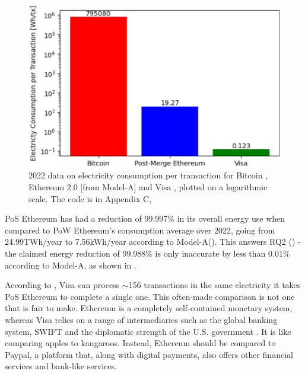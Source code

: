 \begin{figure}[!htb]
    \includegraphics[width=13cm,center]{Figures/ElectricityConsumptionPlot.png}
    \caption{2022 data on electricity consumption per transaction for Bitcoin \cite{BitcoinDigiconomist}, Ethereum 2.0 [from Model-A] and Visa \cite{2022VisaReport}, \cite{VisaHome} plotted on a logarithmic scale. The code is in Appendix C, }
    \label{Figure:ElectricityConsumptionPlot}
\end{figure}

PoS Ethereum has had a reduction of 99.997\% in its overall energy use when compared to PoW Ethereum's consumption average over 2022, going from 24.99TWh/year to 7.56kWh/year according to Model-A(\cite{CCRIIndices}). This answers RQ2 () - the claimed energy reduction of 99.988\% is only inaccurate by less than 0.01\% according to Model-A, as shown in .

According to , Visa can process 
$\sim$156 transactions in the same electricity it takes PoS Ethereum to complete a single one. This often-made comparison is not one that is fair to make. Ethereum is a completely self-contained monetary system, whereas Visa relies on a range of intermediaries such as the global banking system, SWIFT and the diplomatic strength of the U.S. government \cite{Carter2021BitcoinComparison}. It is like comparing apples to kangaroos. Instead, Ethereum should be compared to Paypal, a platform that, along with digital payments, also offers other financial services and bank-like services.  

